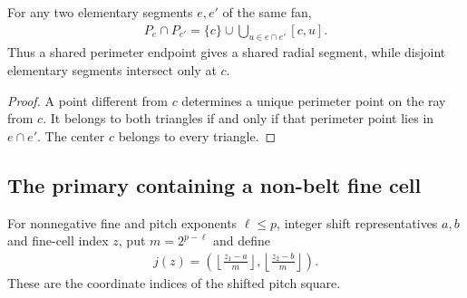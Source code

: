\begin{lemma}
    \label{thm:area_law_cell_fan_intersections}
    \leanok
    For any two elementary segments $e,e'$ of the same fan,
    \begin{align}
        P_e\cap P_{e'}
        =\{c\}\cup\bigcup_{u\in e\cap e'}[c,u].
    \end{align}
    Thus a shared perimeter endpoint gives a shared radial segment,
    while disjoint elementary segments intersect only at $c$.
\end{lemma}
\begin{proof}\leanok
    A point different from $c$ determines a unique perimeter point
    on the ray from $c$. It belongs to both triangles if and only if
    that perimeter point lies in $e\cap e'$. The center $c$
    belongs to every triangle.
\end{proof}


\subsection{The primary containing a non-belt fine cell}

\begin{definition}
    \label{def:area_law_nonbelt_pitch_index}
    \leanok
    For nonnegative fine and pitch exponents $\ell\le p$, integer shift representatives
    $a,b$ and fine-cell index $z$, put $m=2^{p-\ell}$ and define
    \begin{align}
        j(z)=\left(\left\lfloor\frac{z_1-a}{m}\right\rfloor,
        \left\lfloor\frac{z_2-b}{m}\right\rfloor\right).
    \end{align}
    These are the coordinate indices of the shifted pitch square.
\end{definition}

